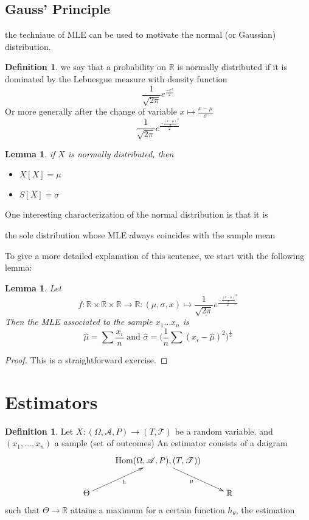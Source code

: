 \documentclass{book}
\theoremstyle{plain}
\newtheorem{lemma}[corollary]{Lemma}
\theoremstyle{definition}
\newtheorem{definition}[corollary]{Definition}
\renewcommand{\d}[1]{\mathbb{#1}}
\newcommand{\fun}{\mapsto}
\DeclareMathOperator{\Hom}{Hom}
\newcommand{\mor}{\longrightarrow}
\renewcommand{\r}[1]{\mathcal{#1}}
\begin{document}
\subsection{Gauss' Principle} the techniaue of MLE can be used to motivate the normal (or Gaussian) distribution.
\begin{definition}
we say that a probability on $\d{R}$ is normally distributed if it is dominated by the Lebuesgue measure with density function
\[
\frac{1}{\sqrt{2\pi}}e^{\frac{-x^2}{2}}
\]
Or more generally after the change of variable $x\fun \frac{x-\mu}{\sigma}$
\[
\frac{1}{\sqrt{2\pi}}e^{\frac{-\frac{(x-\mu)}{\sigma}^2}{2}}
\]
\end{definition}
\begin{lemma}
if $X$ is normally distributed, then
\begin{itemize}
\item $X[X]=\mu$
\item $S[X]=\sigma$	
\end{itemize}

\end{lemma}

One interesting characterization of the normal distribution is that it is \begin{center}
the sole distribution whose MLE always coincides with the sample mean\end{center}
To give a more detailed explanation of this sentence, we start with the following lemma:
\begin{lemma}
Let
\[
f:\d{R}\times \d{R}\times \d{R}\mor \d{R}:(\mu,\sigma,x)\fun \frac{1}{\sqrt{2\pi}}e^{\frac{-\frac{(x-\mu)}{\sigma}^2}{2}}
\]	
Then the MLE associated to the sample $x_1\ldots x_n$ is
\[
\hat{\mu}=\sum \frac{x_i}{n}\textrm{ and }\hat{\sigma}=\big(\frac{1}{n}\sum(x_i-\hat{\mu})^2)^\frac{1}{2}
\]
\end{lemma}
\begin{proof}
This is a straightforward exercise.	
\end{proof}
\section{Estimators}

\begin{definition}
Let $X:(\Omega,\r{A},P)\mor (T,\r{T})$ be a random variable. and $(x_1,\ldots , x_n)$ a sample (set of outcomes) An estimator consists of a daigram
\begin{displaymath}
\xymatrix{
&  \Hom(\Omega,\r{A},P), (T,\r{T}))\ar[dr]_\mu\\
\Theta\ar[ur]_h & & \d{R}
}	
\end{displaymath}
such that $\Theta\mor \d{R}$ attains a maximum for a certain function $h_\theta$, the estimation
\end{definition}
\end{document}

